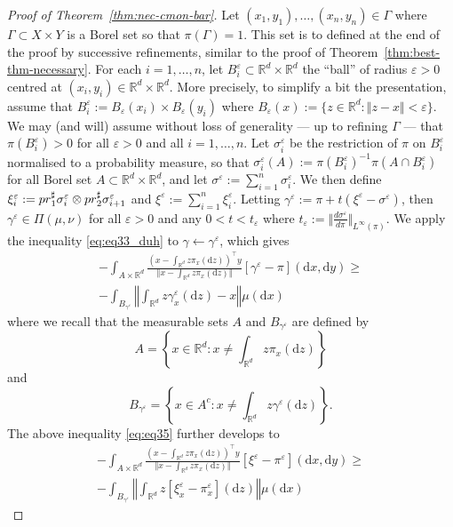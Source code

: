 \documentclass[10pt,a4paper]{amsart}
\newcommand{\R}{\mathbb{R}}
\newcommand{\dd}{\mathrm{d}}
\newcommand{\eps}{\varepsilon}
\newcommand{\pr}{{\rm pr}}
\begin{document}
	\begin{proof}[Proof of Theorem~\ref{thm:nec-cmon-bar}]
		Let $(x_1, y_1), \dots, (x_n, y_n) \in \Gamma$ where $\Gamma \subset X \times Y$ is a Borel set so that $\pi(\Gamma) = 1$. This set is to defined at the end of the proof by successive refinements, similar to the proof of Theorem~\ref{thm:best-thm-necessary}. For each $i = 1, \dots,n$, let $B_i^\eps \subset \R^d \times \R^d$ the ``ball'' of radius $\eps > 0$ centred at $(x_i, y_i) \in \R^d \times \R^d$. More precisely, to simplify a bit the presentation, assume that $B_i^\eps:=B_\eps(x_i) \times B_\eps(y_i)$ where $B_\eps(x) := \{ z \in \R^d : \Vert z - x \Vert < \eps\}$. We may (and will) assume without loss of generality --- up to refining $\Gamma$ ---  that $\pi(B_i^\eps) > 0$ for all $\eps > 0$ and all $i =1,\dots, n$. Let $\sigma_i^\eps$ be the restriction of $\pi$ on $B_i^\eps$ normalised to a probability measure, so that $\sigma_i^\eps(A) := \pi(B_i^\eps)^{-1}\pi(A \cap B_i^\eps)$ for all Borel set $A \subset \R^d \times \R^d$, and let $\sigma^\eps := \sum_{i = 1}^n \sigma_i^\eps$. We then define $\xi_i^\eps  := \pr_1^\sharp \sigma_i^\eps \otimes \pr_2^\sharp \sigma^\eps_{i+1}$ and $\xi^\eps := \sum_{i =1}^n \xi_i^\eps$. Letting $\gamma^\eps := \pi + t(\xi^\eps - \sigma^\eps)$, then $\gamma^\eps \in \Pi(\mu, \nu)$ for all $\eps > 0$ and any $0 < t < t_\eps$ where $t_\eps := \Vert \frac{d \sigma^\eps}{d \pi} \Vert_{L^\infty(\pi)}$. We apply the inequality \eqref{eq:eq33_duh} to $\gamma \leftarrow \gamma^\eps$, which gives
	 \begin{multline}\label{eq:eq35}
	 	-\int_{A \times \R^d} \frac{(x - \int_{\R^d} z \pi_x(\dd z))^\top y}{\Vert x - \int_{\R^d} z \pi_x(\dd z) \Vert} [\gamma^\eps - \pi](\dd x, \dd y) \geq \\- \int_{B_{\gamma^\eps}} \left\Vert \int_{\R^d} z \gamma_x^\eps(\dd z) - x\right\Vert \mu(\dd x)
	 \end{multline}
	 where we recall that the measurable sets $A$ and $B_{\gamma^\eps}$ are defined by
     $$
     A = \left\{x \in \R^d : x \neq \int_{\R^d} z \pi_x(\dd z) \right\}
     $$
     and 
     \begin{equation}\label{eq:B}
     B_{\gamma^\eps} = \left\{ x \in A^c : x \neq \int_{\R^d} z \gamma^\eps(\dd z)\right\}.
     \end{equation}
     The above inequality \eqref{eq:eq35} further develops to
	 \begin{multline}\label{eq:eq36}
	 		-\int_{A \times \R^d} \frac{(x - \int_{\R^d} z \pi_x(\dd z))^\top y}{\Vert x - \int_{\R^d} z \pi_x(\dd z) \Vert} [\xi^\eps - \pi^\eps](\dd x, \dd y) \geq \\- \int_{B_{\gamma^\eps}} \left\Vert \int_{\R^d} z [\xi^\eps_x - \pi^\eps_x](\dd z) \right\Vert \mu(\dd x)

\end{multline}
\end{proof}
\end{document}
